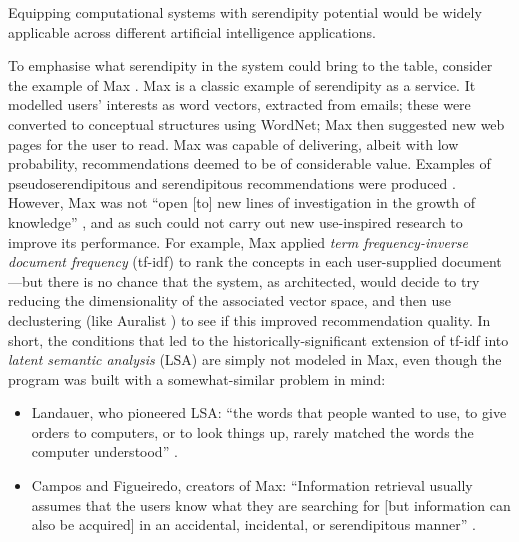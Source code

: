 
Equipping computational systems with serendipity potential would be
widely applicable across different artificial intelligence
applications.

To emphasise what serendipity in the system could bring to the table, consider the example of {\sf Max}
\cite{Figueiredo2001,campos2001searching}.  {\sf Max} is a classic example
of serendipity as a service.  It modelled users'
interests as word vectors, extracted from emails; these were converted
to conceptual structures using WordNet; {\sf Max} then suggested new
web pages for the user to read.  {\sf Max} was capable of delivering,
albeit with low probability, recommendations deemed to be of
considerable value.  Examples of pseudoserendipitous and serendipitous
recommendations were produced \cite[p.~59]{Figueiredo2001}.
However, {\sf Max} was not ``open [to] new lines of
investigation in the growth of knowledge''
\cite{swanson1997interactive}, and as such could not carry out
new use-inspired research to improve its performance.  For example,
{\sf Max} applied \emph{term frequency-inverse document frequency}
(tf-idf) to rank the concepts in each user-supplied document
\cite[p.~160]{campos2001searching}---but there is no chance that the
system, as architected, would decide to try reducing the dimensionality
of the associated vector space, and then use declustering (like {\sf
  Auralist} \cite{Zhang2011}) to see if this improved recommendation
quality.  In short, the conditions that led to the historically-significant
extension of tf-idf into \emph{latent
  semantic analysis} (LSA) are simply not modeled in {\sf Max}, even
though the program was built with a somewhat-similar problem in mind:
\begin{itemize}
\item Landauer, who pioneered LSA: ``the words that people wanted to
  use, to give orders to computers, or to look things up, rarely
  matched the words the computer understood'' \cite{landauer2003pasteur}.
\item Campos and Figueiredo, creators of {\sf Max}: ``Information retrieval usually
  assumes that the users know what they are searching for [but information can also be acquired] in an accidental, incidental, or
  serendipitous manner'' \cite{campos2001searching}.
\end{itemize}

